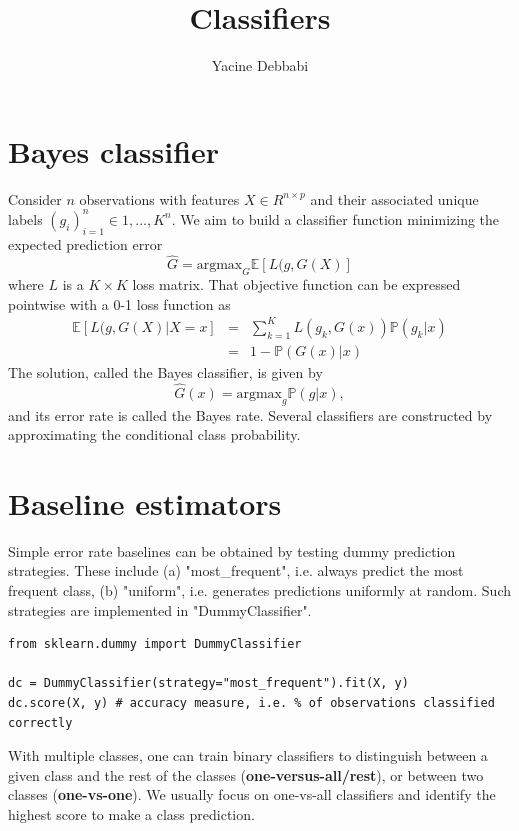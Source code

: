 \documentclass[]{article}
\title{\textbf{Classifiers}}
\author{Yacine Debbabi}
\begin{document}
\maketitle

\tableofcontents

\section{Bayes classifier}

Consider $n$ observations with features $X \in R^{n\times p}$ and their associated unique labels $(g_i)_{i=1}^n\in{1,...,K}^n$. We aim to build a classifier function minimizing the expected prediction error
\begin{equation}
\hat{G}=\mathrm{argmax}_G \mathbb{E}\left[L(g,G(X)\right]
\end{equation}
where $L$ is a $K\times K$ loss matrix. That objective function can be expressed pointwise with a 0-1 loss function as
\begin{eqnarray}
\mathbb{E}\left[L(g,G(X)|X=x\right] &=& \sum_{k=1}^K L(g_k,G(x))\mathbb{P}(g_k|x) \\
&=&1-\mathbb{P}(G(x)|x)
\end{eqnarray}
The solution, called the Bayes classifier, is given by
\begin{equation}
\hat{G}(x)=\mathrm{argmax}_g \mathbb{P}(g|x),
\end{equation}
and its error rate is called the Bayes rate. Several classifiers are constructed by approximating the conditional class probability.

\section{Baseline estimators}

\noindent Simple error rate baselines can be obtained by testing dummy prediction strategies. These include (a) "most\_frequent", i.e. always predict the most frequent class, (b) "uniform", i.e. generates predictions uniformly at random. Such strategies are implemented in "DummyClassifier".

\begin{lstlisting}
from sklearn.dummy import DummyClassifier

dc = DummyClassifier(strategy="most_frequent").fit(X, y)
dc.score(X, y) # accuracy measure, i.e. % of observations classified correctly
\end{lstlisting}

\noindent With multiple classes, one can train binary classifiers to distinguish between a given class and the rest of the classes (\textbf{one-versus-all/rest}), or between two classes (\textbf{one-vs-one}). We usually focus on one-vs-all classifiers and identify the highest score to make a class prediction. \\
\end{document}
